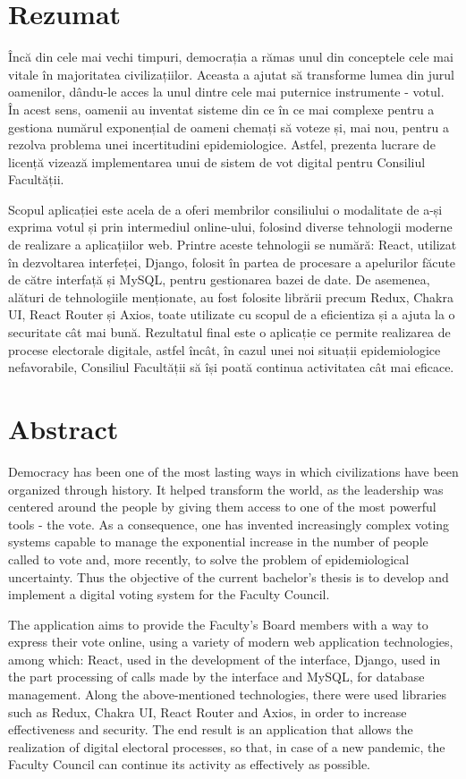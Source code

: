 \section*{Rezumat}

Încă din cele mai vechi timpuri, democrația a rămas unul din conceptele cele mai vitale în majoritatea civilizațiilor. Aceasta a ajutat să transforme lumea din jurul oamenilor, dându-le acces la unul dintre cele mai puternice instrumente - votul. În acest sens, oamenii au inventat sisteme din ce în ce mai complexe pentru a gestiona numărul exponențial de oameni chemați să voteze și, mai nou, pentru a rezolva problema unei incertitudini epidemiologice. Astfel, prezenta lucrare de licență vizează implementarea unui de sistem de vot digital pentru Consiliul Facultății.

Scopul aplicației este acela de a oferi membrilor consiliului o modalitate de a-și exprima votul și prin intermediul online-ului, folosind diverse tehnologii moderne de realizare a aplicațiilor web. Printre aceste tehnologii se numără: React, utilizat în dezvoltarea interfeței, Django, folosit în partea de procesare a apelurilor făcute de către interfață și MySQL, pentru gestionarea bazei de date. De asemenea, alături de tehnologiile menționate, au fost folosite librării precum Redux, Chakra UI, React Router și Axios, toate utilizate cu scopul de a eficientiza și a ajuta la o securitate cât mai bună. Rezultatul final este o aplicație ce permite realizarea de procese electorale digitale, astfel încât, în cazul unei noi situații epidemiologice nefavorabile, Consiliul Facultății să își poată continua activitatea cât mai eficace.

\newpage

\section*{Abstract}

Democracy has been one of the most lasting ways in which civilizations have been organized through history. It helped transform the world, as the leadership was centered around the people by giving them access to one of the most powerful tools - the vote. As a consequence, one has invented increasingly complex voting systems capable to manage the exponential increase in the number of people called to vote and, more recently, to solve the problem of epidemiological uncertainty. Thus the objective of the current bachelor's thesis is to develop and implement a digital voting system for the Faculty Council.

The application aims to provide the Faculty’s Board members with a way to express their vote online, using a variety of modern web application technologies, among which: React, used in the development of the interface, Django, used in the part processing of calls made by the interface and MySQL, for database management. Along the above-mentioned technologies, there were used libraries such as Redux, Chakra UI, React Router and Axios, in order to increase effectiveness and security. The end result is an application that allows the realization of digital electoral processes, so that, in case of a new pandemic, the Faculty Council can continue its activity as effectively as possible.
